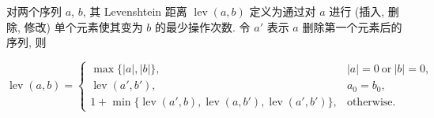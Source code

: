对两个序列 \(a\), \(b\), 其 Levenshtein 距离 \(\operatorname{lev}(a,b)\) 定义为通过对 \(a\) 进行 (插入, 删除, 修改) 单个元素使其变为 \(b\) 的最少操作次数. 令 \(a'\) 表示 \(a\) 删除第一个元素后的序列, 则

\[
    \operatorname{lev}(a,b)=\begin{cases}
        \max\{|a|,|b|\},                                                                       & |a|=0 ~\text{or}~ |b|=0, \\
        \operatorname{lev}(a',b'),                                                             & a_0=b_0,                 \\
        1+\min\{\operatorname{lev}(a',b),\operatorname{lev}(a,b'),\operatorname{lev}(a',b')\}, & \text{otherwise}.
    \end{cases}
\]